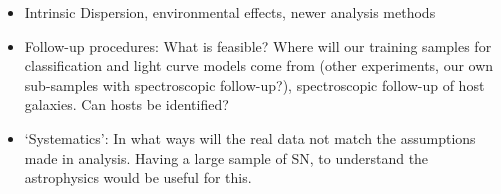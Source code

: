 \begin{itemize}
\item Intrinsic Dispersion, environmental effects, newer analysis methods
\item Follow-up
procedures: What is feasible? Where will our training samples for classification and light
curve models come from (other experiments, our own sub-samples with spectroscopic
follow-up?), spectroscopic follow-up of host galaxies. Can hosts be identified?
\item `Systematics': In what ways will the real data not match the assumptions made in analysis.
Having a large sample of SN, to understand the astrophysics would be useful for this.
\end{itemize}



\navigationbar

%
